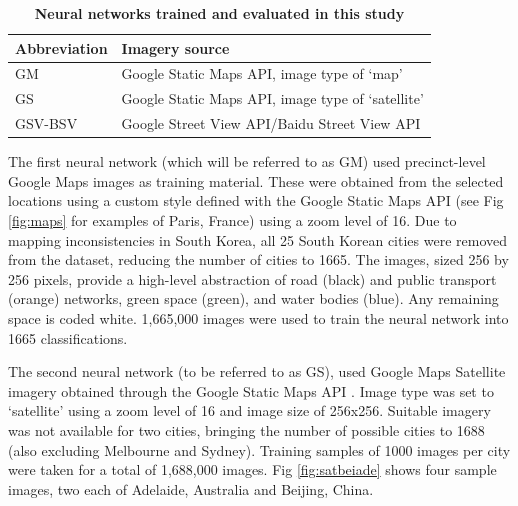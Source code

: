 \documentclass[10pt,letterpaper,hidelinks]{article}
\begin{document}
\begin{table}[!htbp]
\caption{\bf Neural networks trained and evaluated in this study \label{tab:neuralnetworks}}     
\begin{tabular}{ l l }
 \hline Abbreviation   &  Imagery source \\ \hline
GM & Google Static Maps API, image type of `map'     \\ 
GS & Google Static Maps API, image type of `satellite'      \\
GSV-BSV & Google Street View API/Baidu Street View API     \\ \hline

\end{tabular}
\end{table}

The first neural network (which will be referred to as GM) used precinct-level Google Maps images as training material. These were obtained from the selected locations using a custom style defined with the Google Static Maps API \cite{GoogleStatic2017} (see Fig \ref{fig:maps} for examples of Paris, France) using a zoom level of 16. Due to mapping inconsistencies in South Korea, all 25 South Korean cities were removed from the dataset, reducing the number of cities to 1665. The images, sized 256 by 256 pixels, provide a high-level abstraction of road (black) and public transport (orange) networks, green space (green), and water bodies (blue). Any remaining space is coded white. 1,665,000 images were used to train the neural network into 1665 classifications.

%

The second neural network (to be referred to as GS), used Google Maps Satellite imagery obtained through the Google Static Maps API \cite{GoogleStatic2017}. Image type was set to `satellite' using a zoom level of 16 and image size of 256x256. Suitable imagery was not available for two cities, bringing the number of possible cities to 1688 (also excluding Melbourne and Sydney). Training samples of 1000 images per city were taken for a total of 1,688,000 images. Fig \ref{fig:satbeiade} shows four sample images, two each of Adelaide, Australia and Beijing, China. 


\end{document}
